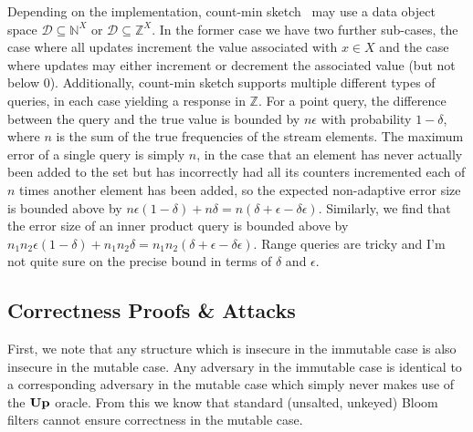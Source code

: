 Depending on the implementation, count-min sketch~\cite{xxx} may use a data object space $\mathcal{D} \subseteq \mathbb{N}^X$ or $\mathcal{D} \subseteq \mathbb{Z}^X$. In the former case we have two further sub-cases, the case where all updates increment the value associated with $x \in X$ and the case where updates may either increment or decrement the associated value (but not below 0). Additionally, count-min sketch supports multiple different types of queries, in each case yielding a response in $\mathbb{Z}$. For a point query, the difference between the query and the true value is bounded by $n\epsilon$ with probability $1-\delta$, where $n$ is the sum of the true frequencies of the stream elements. The maximum error of a single query is simply $n$, in the case that an element has never actually been added to the set but has incorrectly had all its counters incremented each of $n$ times another element has been added, so the expected non-adaptive error size is bounded above by $n\epsilon(1-\delta)+n\delta = n(\delta+\epsilon-\delta\epsilon)$.  Similarly, we find that the error size of an inner product query is bounded above by $n_1n_2\epsilon(1-\delta)+n_1n_2\delta = n_1n_2(\delta+\epsilon-\delta\epsilon)$. Range queries are tricky and I'm not quite sure on the precise bound in terms of $\delta$ and $\epsilon$.

\subsection{Correctness Proofs \& Attacks}

First, we note that any structure which is insecure in the immutable case is also insecure in the mutable case. Any adversary in the immutable case is identical to a corresponding adversary in the mutable case which simply never makes use of the $\mathbf{Up}\hspace{0.5pt}$ oracle. From this we know that standard (unsalted, unkeyed) Bloom filters cannot ensure correctness in the mutable case.

